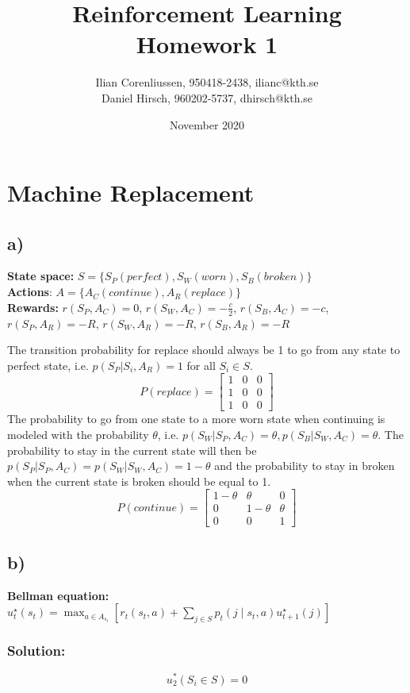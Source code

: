 \documentclass{article}
\title{Reinforcement Learning\\
       Homework 1}
\author{Ilian Corenliussen, 950418-2438, ilianc@kth.se\\ 
        Daniel Hirsch, 960202-5737, dhirsch@kth.se}
\date{November 2020}
\begin{document}
\maketitle

\section{Machine Replacement}
\subsection*{a)}
\textbf{State space:} $S = \{S_P(perfect), S_W(worn), S_B(broken)\} $\\
\textbf{Actions}: $A = \{ A_C (continue), A_R(replace) \}$\\
\textbf{Rewards:} $r(S_P,A_C) = 0$, $r(S_W,A_C) = -\frac{c}{2}$, $r(S_B,A_C) = -c$, $r(S_P, A_R) = -R$, $r(S_W, A_R) = -R$, $r(S_B, A_R) = -R$


The transition probability for replace should always be 1 to go from any state to perfect state, i.e. $p(S_P|S_i, A_R) = 1$ for all $S_i \in S$.  
\[
		P(replace) = \begin{bmatrix}
		        1 & 0 & 0 \\
		        1 & 0 & 0\\
		        1 & 0 & 0
		        \end{bmatrix}
\]
The probability to go from one state to a more worn state when continuing is modeled with the probability $\theta$, i.e. $p(S_W|S_P,A_C)=\theta, p(S_B|S_W,A_C)=\theta$. The probability to stay in the current state will then be $p(S_P|S_P,A_C)=p(S_W|S_W,A_C)=1-\theta$ and the probability to stay in broken when the current state is broken should be equal to 1.
\[
		P(continue) = \begin{bmatrix}
		        1-\theta & \theta & 0 \\
		        0 & 1-\theta & \theta\\
		        0 & 0 & 1
		        \end{bmatrix}
\]
\subsection*{b)}
\textbf{Bellman equation:} $u_{t}^{\star}\left(s_{t}\right)=\max _{a \in A_{s_{t}}}\left[r_{t}\left(s_{t}, a\right)+\sum_{j \in S} p_{t}\left(j \mid s_{t}, a\right) u_{t+1}^{\star}\left(j\right)\right]$

\subsubsection*{Solution:}
\begin{equation}
u_{2}^{*}(S_i \in S)  = 0
\end{equation}
\end{document}
